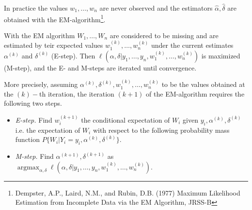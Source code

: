 \documentclass[a4paper,12pt]{article}\usepackage[]{graphicx}\usepackage[]{color}
\DeclareMathOperator*{\argmax}{argmax}
\begin{document}
In practice the values $w_1, \ldots, w_n$ are never observed and the
estimators $\hat{\alpha}, \hat{\delta}$ are obtained with the EM-algorithm\footnote{Dempster, A.P., Laird, N.M., and Rubin, D.B. (1977) Maximum Likelihood
Estimation from Incomplete Data via the EM Algorithm, JRSS-B}.

With the EM algorithm $W_1, \ldots, W_n$ are considered to be missing and are 
estimated
by teir expected values $w_1^{(k)}, \ldots, w_n^{(k)}$ under the current
estimates $\alpha^{(k)}$ and $\delta^{(k)}$ (E-step). Then
$\ell(\alpha, \delta |y_1, \ldots, y_n, w_1^{(k)}, \ldots, w_n^{(k)})$ is 
maximized
(M-step), and the E- and M-steps are iterated until convergence.

More precisely, assuming $\alpha^{(k)}, \delta^{(k)}, w_1^{(k)}, \ldots,
w_n^{(k)}$ to be the values obtained at the $(k)-$th iteration, the iteration 
$(k+1)$
of the EM-algorithm requires the following two steps.
\begin{itemize}
  \item \textit{E-step.}  Find $w_i^{(k+1)}$ the conditional expectation of
$W_i$ given $y_i,  \alpha^{(k)}, \delta^{(k)}$ i.e. the expectation of $W_i$
with respect to the following probability mass function $P\{W_i|Y_i=y_i,
\alpha^{(k)}, \delta^{(k)}\}$.
  \item \textit{M-step.}  Find $\alpha^{(k+1)}, \delta^{(k+1)}$ as
$\argmax_{\alpha, \delta} \ell(\alpha, \delta |y_1, \ldots, y_n, w_1^{(k)},
\ldots, w_n^{(k)})$.
\end{itemize}
\end{document}
